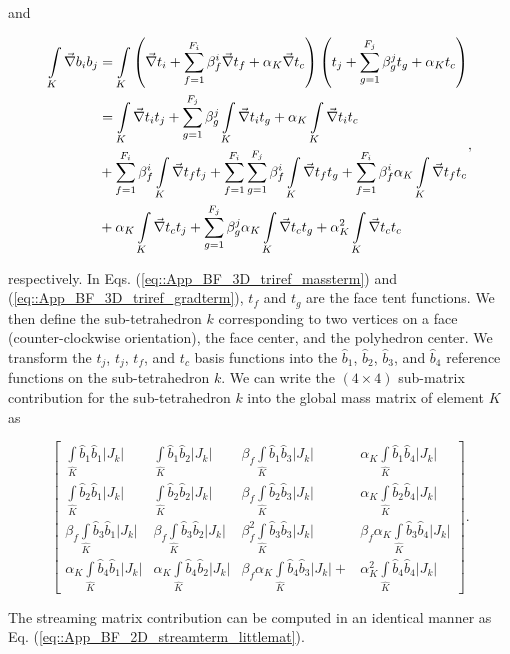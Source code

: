 \noindent and

\begin{equation}
\label{eq::App_BF_3D_triref_gradterm}
\begin{aligned}
\int\displaylimits_K\vec{\nabla} b_i b_j &= \int\displaylimits_K \left(\vec{\nabla} t_i +\sum_{f=1}^{F_i} \beta_f^i  \vec{\nabla}t_f + \alpha_K \vec{\nabla} t_c  \right) \left(  t_j+\sum_{g=1}^{F_j} \beta_g^j  t_g  + \alpha_K t_c \right) \\
&= \int\displaylimits_K\vec{\nabla} t_i t_j +\sum_{g=1}^{F_j} \beta_g^j  \int\displaylimits_K  \vec{\nabla} t_i t_g + \alpha_K \int\displaylimits_K  \vec{\nabla}t_i t_c  \\
&+  \sum_{f=1}^{F_i} \beta_f^i \int\displaylimits_K\vec{\nabla} t_f t_j   + \sum_{f=1}^{F_i} \sum_{g=1}^{F_j} \beta_f^i    \int\displaylimits_K  \vec{\nabla} t_f t_g+ \sum_{f=1}^{F_i} \beta_f^i \alpha_K \int\displaylimits_K \vec{\nabla} t_f t_c \\
&+  \alpha_K \int\displaylimits_K \vec{\nabla} t_c t_j + \sum_{g=1}^{F_j}\beta_g^j  \alpha_K  \int\displaylimits_K \vec{\nabla} t_c t_g   +  \alpha_K^2  \int\displaylimits_K \vec{\nabla} t_c t_c
\end{aligned},
\end{equation}

\noindent respectively. In Eqs. (\ref{eq::App_BF_3D_triref_massterm}) and (\ref{eq::App_BF_3D_triref_gradterm}), $t_f$ and $t_g$ are the face tent functions. We then define the sub-tetrahedron $k$ corresponding to two vertices on a face (counter-clockwise orientation), the face center, and the polyhedron center. We transform the $t_j$, $t_j$, $t_f$, and $t_c$ basis functions into the $\hat{b}_1$, $\hat{b}_2$, $\hat{b}_3$, and $\hat{b}_4$ reference functions on the sub-tetrahedron $k$. We can write the $(4 \times 4)$ sub-matrix contribution for the sub-tetrahedron $k$ into the global mass matrix of element $K$ as

\begin{equation}
\label{eq::App_BF_3D_massterm_littlemat}
\left[
\begin{array}{cccc}
\int\limits_{\hat{K}} \hat{b}_1 \hat{b}_1 |J_k| & \int\limits_{\hat{K}} \hat{b}_1 \hat{b}_2 |J_k|& \beta_f \int\limits_{\hat{K}} \hat{b}_1 \hat{b}_3 |J_k| & \alpha_K \int\limits_{\hat{K}} \hat{b}_1 \hat{b}_4 |J_k| \\
\int\limits_{\hat{K}} \hat{b}_2 \hat{b}_1 |J_k| & \int\limits_{\hat{K}} \hat{b}_2 \hat{b}_2 |J_k| & \beta_f \int\limits_{\hat{K}} \hat{b}_2 \hat{b}_3 |J_k| & \alpha_K \int\limits_{\hat{K}} \hat{b}_2 \hat{b}_4 |J_k|  \\
\beta_f \int\limits_{\hat{K}} \hat{b}_3 \hat{b}_1 |J_k| &\beta_f  \int\limits_{\hat{K}} \hat{b}_3\hat{b}_2 |J_k| & \beta_f^2 \int\limits_{\hat{K}} \hat{b}_3 \hat{b}_3 |J_k| & \beta_f \alpha_K \int\limits_{\hat{K}} \hat{b}_3 \hat{b}_4 |J_k|  \\
\alpha_K \int\limits_{\hat{K}} \hat{b}_4 \hat{b}_1 |J_k| &\alpha_K  \int\limits_{\hat{K}} \hat{b}_4\hat{b}_2 |J_k| &  \beta_f \alpha_K \int\limits_{\hat{K}} \hat{b}_4 \hat{b}_3 |J_k| + & \alpha_K^2 \int\limits_{\hat{K}} \hat{b}_4 \hat{b}_4 |J_k| 
\end{array} \right] .
\end{equation}

\noindent The streaming matrix contribution can be computed in an identical manner as Eq. (\ref{eq::App_BF_2D_streamterm_littlemat}).

